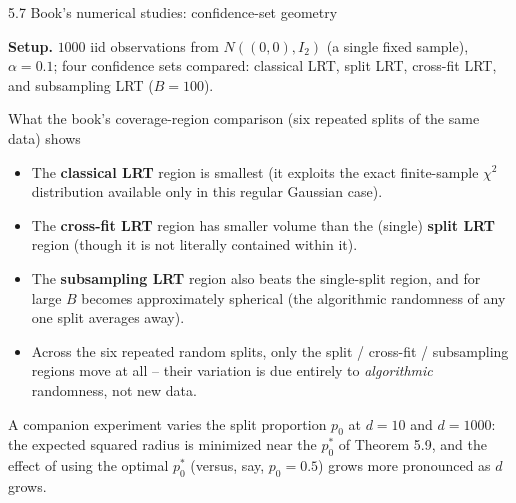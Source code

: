 \documentclass[aspectratio=169,10pt]{beamer}
\begin{document}
\begin{frame}{5.7 Book's numerical studies: confidence-set geometry}

  \textbf{Setup.} $1000$ iid observations from $N((0,0), I_2)$ (a
  single fixed sample), $\alpha=0.1$; four confidence sets compared:
  classical LRT, split LRT, cross-fit LRT, and subsampling LRT
  ($B=100$).

  \begin{block}{What the book's coverage-region comparison (six repeated
    splits of the same data) shows}
    \begin{itemize}
      \item The \textbf{classical LRT} region is smallest (it exploits
        the exact finite-sample $\chi^2$ distribution available only in
        this regular Gaussian case).
      \item The \textbf{cross-fit LRT} region has smaller volume than
        the (single) \textbf{split LRT} region (though it is not
        literally contained within it).
      \item The \textbf{subsampling LRT} region also beats the
        single-split region, and for large $B$ becomes approximately
        spherical (the algorithmic randomness of any one split
        averages away).
      \item Across the six repeated random splits, only the split /
        cross-fit / subsampling regions move at all -- their variation
        is due entirely to \emph{algorithmic} randomness, not new data.
    \end{itemize}
  \end{block}

  A companion experiment varies the split proportion $p_0$ at $d=10$
  and $d=1000$: the expected squared radius is minimized near the
  $p_0^*$ of Theorem 5.9, and the effect of using the optimal $p_0^*$
  (versus, say, $p_0=0.5$) grows more pronounced as $d$ grows.

\end{frame}
\end{document}
